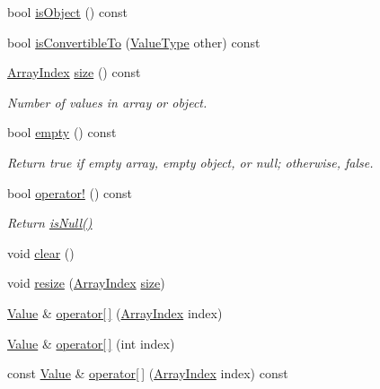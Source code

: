 \begin{DoxyCompactItemize}
\item 
bool \hyperlink{class_json_1_1_value_a8cf96c0f2a552051fcfc78ffee60e037}{is\+Object} () const
\item 
bool \hyperlink{class_json_1_1_value_af1ee6be27a96a7d12128efdd60deb54d}{is\+Convertible\+To} (\hyperlink{namespace_json_a7d654b75c16a57007925868e38212b4e}{Value\+Type} other) const
\item 
\hyperlink{class_json_1_1_value_a184a91566cccca7b819240f0d5561c7d}{Array\+Index} \hyperlink{class_json_1_1_value_a0ec2808e1d7efa4e9fad938d6667be44}{size} () const
\begin{DoxyCompactList}\small\item\em Number of values in array or object. \end{DoxyCompactList}\item 
bool \hyperlink{class_json_1_1_value_a0519a551e37ee6665d74742b3f96bab3}{empty} () const
\begin{DoxyCompactList}\small\item\em Return true if empty array, empty object, or null; otherwise, false. \end{DoxyCompactList}\item 
bool \hyperlink{class_json_1_1_value_a731b89fb4764c39ce2328e1707c822b9}{operator!} () const
\begin{DoxyCompactList}\small\item\em Return \hyperlink{class_json_1_1_value_abde4070e21e46dc4f8203f66582cb19f}{is\+Null()} \end{DoxyCompactList}\item 
void \hyperlink{class_json_1_1_value_a501a4d67e6c875255c2ecc03ccd2019b}{clear} ()
\item 
void \hyperlink{class_json_1_1_value_aa284353271ada427dbfa04a42f2be407}{resize} (\hyperlink{class_json_1_1_value_a184a91566cccca7b819240f0d5561c7d}{Array\+Index} \hyperlink{class_json_1_1_value_a0ec2808e1d7efa4e9fad938d6667be44}{size})
\item 
\hyperlink{class_json_1_1_value}{Value} \& \hyperlink{class_json_1_1_value_a9cca2c37d854443604b678f2236527ad}{operator\mbox{[}$\,$\mbox{]}} (\hyperlink{class_json_1_1_value_a184a91566cccca7b819240f0d5561c7d}{Array\+Index} index)
\item 
\hyperlink{class_json_1_1_value}{Value} \& \hyperlink{class_json_1_1_value_ad4b78dd032292ab1d91a3f89110b0d0e}{operator\mbox{[}$\,$\mbox{]}} (int index)
\item 
const \hyperlink{class_json_1_1_value}{Value} \& \hyperlink{class_json_1_1_value_a3b1aece4ef292926e2bdb42fed925508}{operator\mbox{[}$\,$\mbox{]}} (\hyperlink{class_json_1_1_value_a184a91566cccca7b819240f0d5561c7d}{Array\+Index} index) const

\end{DoxyCompactItemize}
